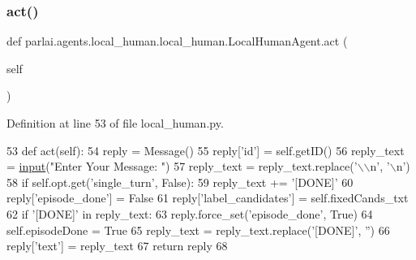 \subsubsection{\texorpdfstring{act()}{act()}}
{\footnotesize\ttfamily def parlai.\+agents.\+local\+\_\+human.\+local\+\_\+human.\+Local\+Human\+Agent.\+act (\begin{DoxyParamCaption}\item[{}]{self }\end{DoxyParamCaption})}



Definition at line 53 of file local\+\_\+human.\+py.


\begin{DoxyCode}
53     \textcolor{keyword}{def }act(self):
54         reply = Message()
55         reply[\textcolor{stringliteral}{'id'}] = self.getID()
56         reply\_text = \hyperlink{namespaceparlai_1_1mturk_1_1core_1_1dev_1_1test_1_1test__full__system_a1e1817cd65688fb90f827834d1fb4567}{input}(\textcolor{stringliteral}{"Enter Your Message: "})
57         reply\_text = reply\_text.replace(\textcolor{stringliteral}{'\(\backslash\)\(\backslash\)n'}, \textcolor{stringliteral}{'\(\backslash\)n'})
58         \textcolor{keywordflow}{if} self.opt.get(\textcolor{stringliteral}{'single\_turn'}, \textcolor{keyword}{False}):
59             reply\_text += \textcolor{stringliteral}{'[DONE]'}
60         reply[\textcolor{stringliteral}{'episode\_done'}] = \textcolor{keyword}{False}
61         reply[\textcolor{stringliteral}{'label\_candidates'}] = self.fixedCands\_txt
62         \textcolor{keywordflow}{if} \textcolor{stringliteral}{'[DONE]'} \textcolor{keywordflow}{in} reply\_text:
63             reply.force\_set(\textcolor{stringliteral}{'episode\_done'}, \textcolor{keyword}{True})
64             self.episodeDone = \textcolor{keyword}{True}
65             reply\_text = reply\_text.replace(\textcolor{stringliteral}{'[DONE]'}, \textcolor{stringliteral}{''})
66         reply[\textcolor{stringliteral}{'text'}] = reply\_text
67         \textcolor{keywordflow}{return} reply
68 
\end{DoxyCode}
\mbox{\label{classparlai_1_1agents_1_1local__human_1_1local__human_1_1LocalHumanAgent_abc9993870cbd73a7706abef20021d6ca}} 
